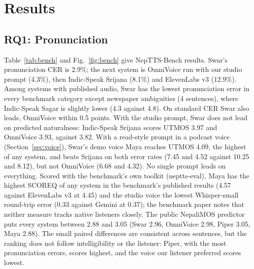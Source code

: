 \section{Results}\label{sec:results}

\subsection{RQ1: Pronunciation}
Table~\ref{tab:bench} and Fig.~\ref{fig:bench} give NepTTS-Bench results. Swar's pronunciation CER is 2.9\%; the next system is OmniVoice run with our studio prompt (4.3\%), then Indic-Speak Srijana (8.1\%) and ElevenLabs v3 (12.9\%). Among systems with published audio, Swar has the lowest pronunciation error in every benchmark category except newspaper ambiguities (4 sentences), where Indic-Speak Sagar is slightly lower (4.3 against 4.8). On standard CER Swar also leads, OmniVoice within 0.5 points. With the studio prompt, Swar does not lead on predicted naturalness: Indic-Speak Srijana scores UTMOS 3.97 and OmniVoice 3.93, against 3.82. With a read-style prompt in a podcast voice (Section~\ref{sec:voice}), Swar's demo voice Maya reaches UTMOS 4.09, the highest of any system, and beats Srijana on both error rates (7.45 and 4.52 against 10.25 and 8.12), but not OmniVoice (6.68 and 4.32). No single prompt leads on everything. Scored with the benchmark's own toolkit (neptts-eval), Maya has the highest SCOREQ of any system in the benchmark's published results (4.57 against ElevenLabs v3 at 4.45) and the studio voice the lowest Whisper-small round-trip error (0.33 against Gemini at 0.37); the benchmark paper notes that neither measure tracks native listeners closely. The public NepaliMOS predictor puts every system between 2.88 and 3.05 (Swar 2.96, OmniVoice 2.98, Piper 3.05, Maya 2.88). The small paired differences are consistent across sentences, but the ranking does not follow intelligibility or the listener: Piper, with the most pronunciation errors, scores highest, and the voice our listener preferred scores lowest.

